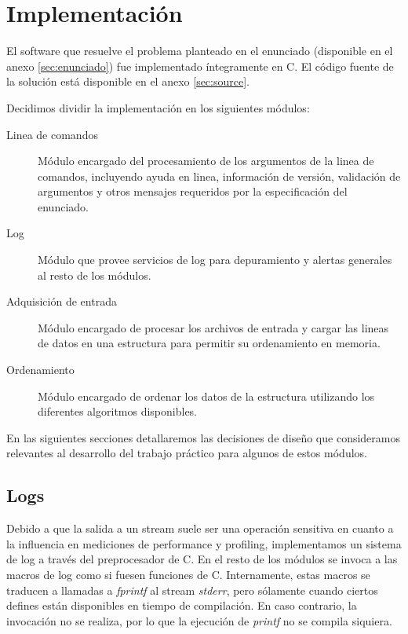 \documentclass[a4paper,11pt]{article}
\begin{document}
\section{Implementación}

El software que resuelve el problema planteado en el enunciado (disponible en
el anexo \ref{sec:enunciado}) fue implementado íntegramente en C. El código
fuente de la solución está disponible en el anexo \ref{sec:source}.

Decidimos dividir la implementación en los siguientes módulos:

\begin{description}

  \item[Linea de comandos] Módulo encargado del procesamiento de los argumentos
    de la linea de comandos, incluyendo ayuda en linea, información de versión,
    validación de argumentos y otros mensajes requeridos por la especificación
    del enunciado.

  \item[Log] Módulo que provee servicios de log para depuramiento y alertas
    generales al resto de los módulos.

  \item[Adquisición de entrada] Módulo encargado de procesar los archivos de
    entrada y cargar las lineas de datos en una estructura para permitir su
    ordenamiento en memoria.

  \item[Ordenamiento] Módulo encargado de ordenar los datos de la estructura
    utilizando los diferentes algoritmos disponibles.

\end{description}

En las siguientes secciones detallaremos las decisiones de diseño que
consideramos relevantes al desarrollo del trabajo práctico para algunos de
estos módulos.

\subsection{Logs}

Debido a que la salida a un stream suele ser una operación sensitiva en cuanto
a la influencia en mediciones de performance y profiling, implementamos un
sistema de log a través del preprocesador de C. En el resto de los módulos se
invoca a las macros de log como si fuesen funciones de C. Internamente, estas
macros se traducen a llamadas a \textit{fprintf} al stream \textit{stderr},
pero sólamente cuando ciertos defines están disponibles en tiempo de
compilación. En caso contrario, la invocación no se realiza, por lo que la
ejecución de \textit{printf} no se compila siquiera.
\end{document}
